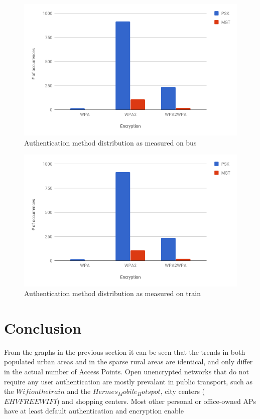 \documentclass[letterpaper, 10 pt, conference]{ieeeconf}  %
\begin{document}
\begin{figure}[h]
\includegraphics[scale=0.4]{Figures/AuthBus.png}
\caption{Authentication method distribution as measured on bus}
\label{fig:busauth}
\end{figure}


\begin{figure}[h]
\includegraphics[scale=0.4]{Figures/AuthTrain.png}
\caption{Authentication method distribution as measured on train}
\label{fig:trainauth}
\end{figure}


\section{Conclusion}
From the graphs in the previous section it can be seen that the trends in both populated urban areas and in the sparse rural areas are identical, and only differ in the actual number of Access Points. Open unencrypted networks that do not require any user authentication are mostly prevalant in public transport, such as the $Wifi on the train$ and the $ Hermes_Mobile_Hotspot$, city centers ($EHV FREE WIFI$) and shopping centers. Most other personal or office-owned APs have at least default authentication and encryption enable
\end{document}
